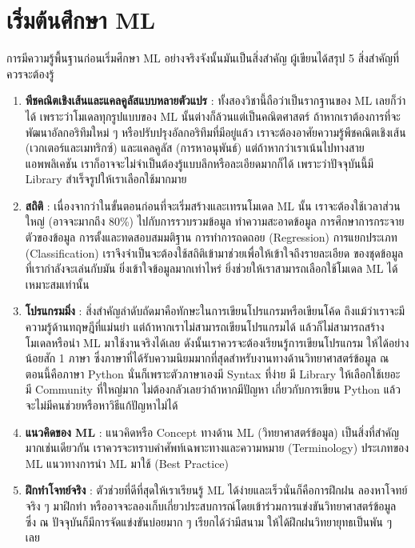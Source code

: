 \section{เริ่มต้นศึกษา ML}

การมีความรู้พื้นฐานก่อนเริ่มศึกษา ML อย่างจริงจังนั้นมันเป็นสิ่งสำคัญ ผู้เขียนได้สรุป 5 สิ่งสำคัญที่ควรจะต้องรู้ 

\begin{enumerate}
    \item \textbf{พีชคณิตเชิงเส้นและแคลคูลัสแบบหลายตัวแปร} : ทั้งสองวิชานี้ถือว่าเป็นรากฐานของ ML เลยก็ว่าได้ 
    เพราะว่าโมเดลทุกรูปแบบของ ML นั้นต่างก็ล้วนแต่เป็นคณิตศาสตร์ ถ้าหากเราต้องการที่จะพัฒนาอัลกอริทึมใหม่ ๆ 
    หรือปรับปรุงอัลกอริทึมที่มีอยู่แล้ว เราจะต้องอาศัยความรู้พีชคณิตเชิงเส้น (เวกเตอร์และเมทริกซ์) และแคลคูลัส (การหาอนุพันธ์) 
    แต่ถ้าหากว่าเราเน้นไปทางสายแอพพลิเคชัน เราก็อาจจะไม่จำเป็นต้องรู้แบบลึกหรือละเอียดมากก็ได้ เพราะว่าปัจจุบันนี้มี Library สำเร็จรูปให้เราเลือกใช้มากมาย
    \item \textbf{สถิติ} : เนื่องจากว่าในขั้นตอนก่อนที่จะเริ่มสร้างและเทรนโมเดล ML นั้น เราจะต้องใช้เวลาส่วนใหญ่ 
    (อาจจะมากถึง 80\%) ไปกับการรวบรวมข้อมูล ทำความสะอาดข้อมูล การศึกษาการกระจายตัวของข้อมูล การตั้งและทดสอบสมมติฐาน 
    การทำการถดถอย (Regression) การแยกประเภท (Classification) เราจึงจำเป็นจะต้องใช้สถิติเข้ามาช่วยเพื่อให้เข้าใจถึงรายละเอียด
    ของชุดข้อมูลที่เรากำลังจะเล่นกับมัน ยิ่งเข้าใจข้อมูลมากเท่าไหร่ ยิ่งช่วยให้เราสามารถเลือกใช้โมเดล ML ได้เหมาะสมเท่านั้น 
    \item \textbf{โปรแกรมมิ่ง} : สิ่งสำคัญลำดับถัดมาคือทักษะในการเขียนโปรแกรมหรือเขียนโค้ด ถึงแม้ว่าเราจะมีความรู้ด้านทฤษฎีที่แม่นยำ 
    แต่ถ้าหากเราไม่สามารถเขียนโปรแกรมได้ แล้วก็ไม่สามารถสร้างโมเดลหรือนำ ML มาใช้งานจริงได้เลย ดังนั้นเราควรจะต้องเรียนรู้การเขียนโปรแกรม
    ให้ได้อย่างน้อยสัก 1 ภาษา ซึ่งภาษาที่ได้รับความนิยมมากที่สุดสำหรับงานทางด้านวิทยาศาสตร์ข้อมูล ณ ตอนนี้คือภาษา Python 
    นั่นก็เพราะตัวภาษาเองมี Syntax ที่ง่าย มี Library ให้เลือกใช้เยอะ มี Community ที่ใหญ่มาก ไม่ต้องกลัวเลยว่าถ้าหากมีปัญหา%
    เกี่ยวกับการเขียน Python แล้วจะไม่มีคนช่วยหรือหาวิธีแก้ปัญหาไม่ได้
    \item \textbf{แนวคิดของ ML} : แนวคิดหรือ Concept ทางด้าน ML (วิทยาศาสตร์ข้อมูล) เป็นสิ่งที่สำคัญมากเช่นเดียวกัน
    เราควรจะทราบคำศัพท์เฉพาะทางและความหมาย (Terminology) ประเภทของ ML แนวทางการนำ ML มาใช้ (Best Practice)
    \item \textbf{ฝึกทำโจทย์จริง} : ตัวช่วยที่ดีที่สุดให้เราเรียนรู้ ML ได้ง่ายและเร็วนั่นก็คือการฝึกฝน ลองหาโจทย์จริง ๆ มาฝึกทำ
    หรืออาจจะลองเก็บเกี่ยวประสบการณ์โดยเข้าร่วมการแข่งขันวิทยาศาสตร์ข้อมูล ซึ่ง ณ ปัจจุบันก็มีการจัดแข่งขันบ่อยมาก ๆ เรียกได้ว่ามีสนาม
    ให้ได้ฝึกฝนวิทยายุทธเป็นพัน ๆ เลย
\end{enumerate}

